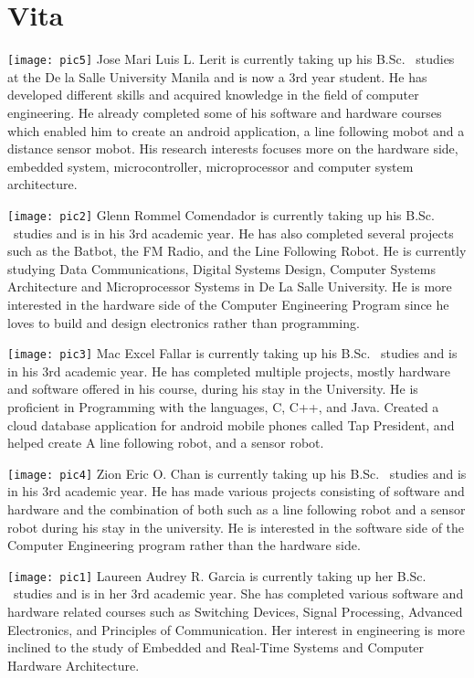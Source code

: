 \chapter{Vita}



\vfill

\texttt{[image: pic5]}
Jose Mari Luis L. Lerit is currently taking up his B.Sc. \degree \ studies at the De la Salle University Manila and is now a 3rd year student.  He has developed different skills and acquired knowledge in the field of computer engineering. He already completed some of his software and hardware courses which enabled him to create an android application, a line following mobot and a distance sensor mobot. His research interests focuses more on the hardware side, embedded system, microcontroller, microprocessor and computer system architecture.

\vspace{5mm}
\texttt{[image: pic2]}
Glenn Rommel Comendador is currently taking up his B.Sc. \degree \ studies and is in his 3rd academic year. He has also completed several projects such as the Batbot, the FM Radio, and the Line Following Robot. He is currently studying Data Communications, Digital Systems Design, Computer Systems Architecture and Microprocessor Systems in De La Salle University. He is more interested in the hardware side of the Computer Engineering Program since he loves to build and design electronics rather than programming.

\vspace{5mm}
\texttt{[image: pic3]}
Mac Excel Fallar is currently taking up his B.Sc. \degree \ studies and is in his 3rd academic year. He has completed multiple projects, mostly hardware and software offered in his course, during his stay in the University. He is proficient in Programming with the languages, C, C++, and Java. Created a cloud database application for android mobile phones called Tap President, and helped create A line following robot, and a sensor robot. 

\vspace{5mm}
\texttt{[image: pic4]}
 Zion Eric O. Chan is currently taking up his B.Sc. \degree \ studies and is in his 3rd academic year. He has made various projects consisting of software and hardware and the combination of both such as a line following robot and a sensor robot during his stay in the university. He is interested in the software side of the Computer Engineering program rather than the hardware side.

\vspace{5mm}
\texttt{[image: pic1]}
Laureen Audrey R. Garcia is currently taking up her B.Sc. \degree \ studies and is in her 3rd academic year. She has completed various software and hardware related courses such as Switching Devices, Signal Processing, Advanced Electronics, and Principles of Communication. Her interest in engineering is more inclined to the study of Embedded and Real-Time Systems and Computer Hardware Architecture.




\vfill
